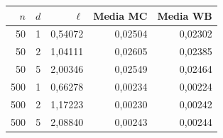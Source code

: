 \begin{tabular}{rrrrr}
\toprule
$n$ & $d$ & $\ell$ & Media MC & Media WB\\
\midrule
50 & 1 & 0,54072 & 0,02504 & 0,02302 \\
50 & 2 & 1,04111 & 0,02605 & 0,02385 \\
50 & 5 & 2,00346 & 0,02549 & 0,02464 \\
500 & 1 & 0,66278 & 0,00234 & 0,00224 \\
500 & 2 & 1,17223 & 0,00230 & 0,00242 \\
500 & 5 & 2,08840 & 0,00243 & 0,00244 \\
\bottomrule
\end{tabular}
